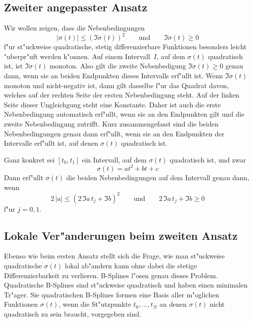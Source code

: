 \documentclass[a4paper]{scrartcl}
\begin{document}
\subsection{Zweiter angepasster Ansatz} \label{sec:2ndansatz}

Wir wollen zeigen, dass die Nebenbedingungen 
$$ \lvert\ddot\sigma(t)\rvert \le (\Im\dot\sigma(t))^2 
\qquad \text{und} \qquad
\Im\dot\sigma(t)\ge0 $$
f"ur st"uckweise quadratische, stetig differenzierbare Funktionen besonders leicht "uberpr"uft werden k"onnen. Auf einem Intervall~$I$, auf dem $\sigma(t)$ quadratisch ist, ist $\Im\dot\sigma(t)$ monoton. Also gilt die zweite Nebenbedigung $\Im\dot\sigma(t)\ge0$ genau dann, wenn sie an beiden Endpunkten dieses Intervalls erf"ullt ist. Wenn $\Im\dot\sigma(t)$ monoton und nicht-negativ ist, dann gilt dasselbe f"ur das Quadrat davon, welches auf der rechten Seite der ersten Nebenbedingung steht. Auf der linken Seite dieser Ungleichgung steht eine Konstante. Daher ist auch die erste Nebenbedingung automatisch erf"ullt, wenn sie an den Endpunkten gilt und die zweite Nebenbedingung zutrifft. Kurz zusammengefasst sind die beiden Nebenbedingungen genau dann erf"ullt, wenn sie an den Endpunkten der Intervalle erf"ullt ist, auf denen $\sigma(t)$ quadratisch ist.

Ganz konkret sei $[t_0,t_1]$ ein Intervall, auf dem $\sigma(t)$ quadratisch ist, und zwar
$$ \sigma(t) = at^2 + bt + c $$
Dann erf"ullt $\sigma(t)$ die beiden Nebenbedingungen auf dem Intervall genau dann, wenn 
$$ 2\,\lvert a\rvert \le (2\,\Im a\,t_j + \Im b)^2
\qquad \text{und} \qquad
2\,\Im a\,t_j + \Im b\ge 0 $$
f"ur $j=0,1$. 


\subsection{Lokale Ver"anderungen beim zweiten Ansatz} \label{sec:2ndansatzLocalChanges}

Ebenso wie beim ersten Ansatz stellt sich die Frage, wie man st"uckweise quadratische $\sigma(t)$ lokal ab"andern kann ohne dabei die stetige Differenzierbarkeit zu verlieren. B-Splines l"osen genau dieses Problem. Quadratische B-Splines sind st"uckweise quadratisch und haben einen minimalen Tr"ager. Sie quadratischen B-Splines formen eine Basis aller m"oglichen Funktionen $\sigma(t)$, wenn die St"utzpunkte $t_0,\dotsc, t_N$ an denen $\sigma(t)$ nicht quadratisch zu sein braucht, vorgegeben sind. 
\end{document}
